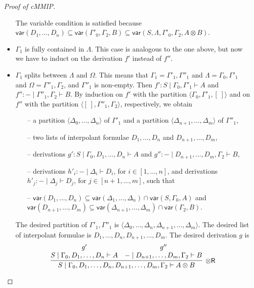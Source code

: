 \documentclass[sn-mathphys-num]{sn-jnl}%
\newcommand{\GG}{\Gamma}
\newcommand{\GD}{\Delta}
\newcommand{\GL}{\Lambda}
\newcommand{\GO}{\Omega}
\newcommand{\vd}{\vdash}
\newcommand{\tr}{\otimes\mathsf{R}}
\newcommand{\ot}{\otimes}
\newcommand{\mf}[1]{\mathsf{#1}}
\newcommand{\gs}[1]{\sigma_{X} (#1)}
\newcommand{\vars}[1]{\mf{var} (#1)}
\newcommand{\cMMIP}{\textsf{cMMIP}}
\theoremstyle{thmstyleone}%
\theoremstyle{thmstyletwo}%
\theoremstyle{thmstylethree}%
\begin{document}
\begin{proof}[Proof of \cMMIP]
\begin{itemize}
    The variable condition is satisfied because $\vars{D_1 , \dots , D_n} \subseteq \vars{ \GG'_0 , \GG_2 , B} \subseteq \vars{S, \GL, \GG'_0 , \GG_2 , A \ot B}$.
    \item $\GG_1$ is fully contained in $\GL$. This case is analogous to the one above, but now we have to induct on the derivation $f'$ instead of $f''$.
    \item $\GG_1$ splits between $\GL$ and $\GO$.
    This means that $\GG_1 = \GG'_1 , \GG''_1$ and $\GL = \GG_0 , \GG'_1$ and $\GO = \GG''_1 , \GG_2$, and $\GG''_1$ is non-empty.
    Then $f' : S \mid \GG_0,\GG'_1 \vd A$ and $f'' : {-} \mid \GG''_1,\GG_2 \vd B$.
    By induction on $f'$ with the partition $\langle \GG_0, \GG'_1,[\ ] \rangle$ and on $f''$ with the partition $\langle [\ ],\GG''_1,\GG_2 \rangle$, respectively, we obtain
    \begin{itemize}
      \item[--] a partition $\langle \GD_0, \dots , \GD_n \rangle$ of $\GG'_1$ and a partition $\langle \GD_{n+1}, \dots , \GD_m \rangle$ of $\GG''_1$,
      \item[--] two lists of interpolant formulae $D_1, \dots , D_n$ and $D_{n+1}, \dots , D_m$,
      \item[--] derivations $g' : S \mid \GG_0 , D_1 , \dots , D_n \vd A$ and $g'' : {-} \mid D_{n+1} , \dots , D_{m} , \GG_2 \vd B$,
      \item[--] derivations $h'_i : {-} \mid \GD_i \vd D_i$, for $i \in [1,\dots , n]$, and derivations $h'_j : {-} \mid \GD_j \vd D_j$, for $j \in [n+1,\dots , m]$, such that
      \item[--] $\vars{D_1 , \dots , D_n} \subseteq \vars{\GD_1 , \dots , \GD_n} \cap \vars{ S, \GG_0 , A}$ and $\vars{D_{n+1} , \dots , D_{m}} \subseteq \vars{\GD_{n+1} , \dots , \GD_m} \cap \vars{\GG_2 , B}$.
    \end{itemize}
    The desired partition of $\GG'_1,\GG''_1$ is $\langle \GD_0, \dots , \GD_n, \GD_{n+1}, \dots , \GD_m \rangle$.
    The desired list of interpolant formulae is $D_1, \dots , D_n,D_{n+1}, \dots , D_m$.
    The desired derivation $g$ is
    \begin{displaymath}
      \infer[\tr]{S \mid \GG_0 , D_1 , \dots , D_n , D_{n+1} , \dots , D_{m}, \GG_2 \vd A \ot B}{
      \deduce{S \mid \GG_0 , D_1 , \dots , D_n \vd A}{g'}
      &
      \deduce{{-} \mid D_{n+1} , \dots , D_{m}, \GG_2 \vd B}{g''}
}
\end{displaymath}
\end{itemize}
\end{proof}
\end{document}
